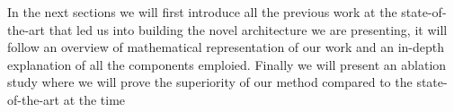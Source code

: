 In the next sections we will first introduce all the previous work at the state-of-the-art that led us into building the novel architecture we are presenting, it will follow an overview of mathematical representation of our work and an in-depth explanation of all the components emploied. 
Finally we will present an ablation study where we will prove the superiority of our method compared to the state-of-the-art at the time
